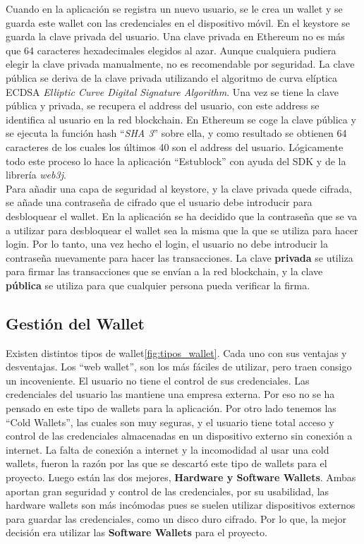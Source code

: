 Cuando en la aplicación se registra un nuevo usuario, se le crea un wallet y se guarda este wallet con las credenciales en el dispositivo móvil. En el keystore se guarda la clave privada del usuario. Una clave privada en Ethereum no es más que 64 caracteres hexadecimales elegidos al azar. Aunque cualquiera pudiera elegir la clave privada manualmente, no es recomendable por seguridad. La clave pública se deriva de la clave privada utilizando el algoritmo de curva elíptica ECDSA \emph{Elliptic Curve Digital Signature Algorithm}. Una vez se tiene la clave pública y privada, se recupera el address del usuario, con este address se identifica al usuario en la red blockchain. En Ethereum se coge la clave pública y se ejecuta la función hash ``\emph{SHA 3}'' sobre ella, y como resultado se obtienen 64 caracteres de los cuales los últimos 40 son el address del usuario. Lógicamente todo este proceso lo hace la aplicación ``Estublock'' con ayuda del SDK y de la librería \emph{web3j}. \\

Para añadir una capa de seguridad al keystore, y la clave privada quede cifrada, se añade una contraseña de cifrado que el usuario debe introducir para desbloquear el wallet. En la aplicación se ha decidido que la contraseña que se va a utilizar para desbloquear el wallet sea la misma que la que se utiliza para hacer login. Por lo tanto, una vez hecho el login, el usuario no debe introducir la contraseña nuevamente para hacer las transacciones. La clave \textbf{privada} se utiliza para firmar las transacciones que se envían a la red blockchain, y la clave \textbf{pública} se utiliza para que cualquier persona pueda verificar la firma. \\

\subsection{Gestión del Wallet}

Existen distintos tipos de wallet\ref{fig:tipos_wallet}. Cada uno con sus ventajas y desventajas. Los ``web wallet'', son los más fáciles de utilizar, pero traen consigo un incoveniente. El usuario no tiene el control de sus credenciales. Las credenciales del usuario las mantiene una empresa externa. Por eso no se ha pensado en este tipo de wallets para la aplicación. Por otro lado tenemos las ``Cold Wallets'', las cuales son muy seguras, y el usuario tiene total acceso y control de las credenciales almacenadas en un dispositivo externo sin conexión a internet. La falta de conexión a internet y la incomodidad al usar una cold wallets, fueron la razón por las que se descartó este tipo de wallets para el proyecto. Luego están las dos mejores, \textbf{Hardware y Software Wallets}. Ambas aportan gran seguridad y control de las credenciales, por su usabilidad, las hardware wallets son más incómodas pues se suelen utilizar dispositivos externos para guardar las credenciales, como un disco duro cifrado. Por lo que, la mejor decisión era utilizar las \textbf{Software Wallets} para el proyecto. \\

